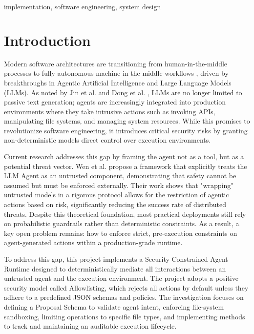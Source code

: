 \documentclass[conference]{IEEEtran}
\begin{document}
\begin{IEEEkeywords} 
implementation, software engineering, system design
\end{IEEEkeywords}

\section{Introduction}

Modern software architectures are transitioning from human-in-the-middle processes to fully autonomous machine-in-the-middle workflows , driven by breakthroughs in Agentic Artificial Intelligence and Large Language Models (LLMs). As noted by Jin et al. \cite{jin2025llmsllmbasedagentssoftware} and Dong et al. \cite{dong2025surveycodegenerationllmbased}, LLMs are no longer limited to passive text generation; agents are increasingly integrated into production environments where they take intrusive actions such as invoking APIs, manipulating file systems, and managing system resources. While this promises to revolutionize software engineering, it introduces critical security risks by granting non-deterministic models direct control over execution environments.

Current research addresses this gap by framing the agent not as a tool, but as a potential threat vector. Wen et al. \cite{wen2024adaptivedeploymentuntrustedllms} propose a framework that explicitly treats the LLM Agent as an untrusted component, demonstrating that safety cannot be assumed but must be enforced externally. Their work shows that "wrapping" untrusted models in a rigorous protocol allows for the restriction of agentic actions based on risk, significantly reducing the success rate of distributed threats. Despite this theoretical foundation, most practical deployments still rely on probabilistic guardrails rather than deterministic constraints. As a result, a key open problem remains: how to enforce strict, pre-execution constraints on agent-generated actions within a production-grade runtime.

To address this gap, this project implements a Security-Constrained Agent Runtime designed to deterministically mediate all interactions between an untrusted agent and the execution environment. The project adopts a positive security model called Allowlisting, which rejects all actions by default unless they adhere to a predefined JSON schemas and policies. The investigation focuses on defining a Proposal Schema to validate agent intent, enforcing file-system sandboxing, limiting operations to specific file types, and implementing methods to track and maintaining an auditable execution lifecycle. 
\end{document}
